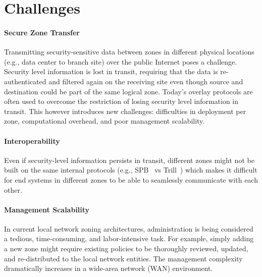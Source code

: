 \section{Challenges}
\label{sec:challenges}

\paragraph{Secure Zone Transfer}
Transmitting security-sensitive data between zones in different physical locations (e.g., 
data center to branch site) over the public Internet poses a challenge. 
Security level information is lost in transit, requiring that the data is re-authenticated and 
filtered again on the receiving site even though source and destination could be part of the 
same logical zone.
Today's overlay protocols are often used to overcome the restriction of losing 
security level information in transit. This however introduces new challenges: difficulties 
in deployment per zone, computational overhead, and poor management scalability. 

\paragraph{Interoperability}
Even if security-level information persists in transit, different zones might not be 
built on the same internal protocols (e.g., SPB~\cite{ieee2012spb} vs Trill~\cite{rfc6325}) 
which makes it difficult
for end systems in different zones to be able to seamlessly communicate with each other.

\paragraph{Management Scalability}
In current local network zoning architectures, administration is being considered a tedious, 
time-consuming, and labor-intensive task. For example, simply adding a new zone might
require existing policies to be thoroughly reviewed, updated, and re-distributed
to the local network entities. The management complexity dramatically increases in a 
wide-area network (WAN) environment.


